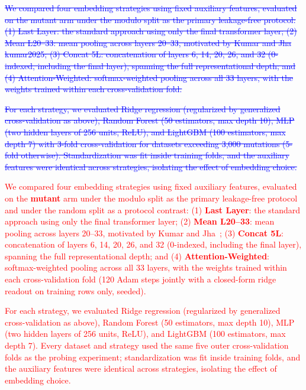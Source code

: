 \documentclass[11pt,a4paper]{article}
\newcommand{\rev}[1]{\textcolor{red}{#1}}
\begin{document}
\textcolor{blue}{\sout{We compared four embedding strategies using fixed auxiliary features,
evaluated on the mutant arm under the modulo split as the primary
leakage-free protocol: (1) Last Layer: the standard approach using only the
final transformer layer;
(2) Mean L20--33: mean pooling across layers 20--33, motivated by
Kumar and Jha kumar2025;
(3) Concat 5L: concatenation of layers 6, 14, 20, 26, and 32 (0-indexed,
including the final layer), spanning the full representational depth; and
(4) Attention-Weighted: softmax-weighted pooling across all 33 layers, with
the weights trained within each cross-validation fold.}}

\textcolor{blue}{\sout{For each strategy, we evaluated Ridge regression (regularized by generalized
cross-validation as above), Random Forest (50 estimators,
max depth 10), MLP (two hidden layers of 256 units, ReLU), and LightGBM (100 estimators,
max depth 7) with 3-fold cross-validation for datasets exceeding 3,000 mutations
(5-fold otherwise). Standardization was fit inside training folds, and the auxiliary
features were identical across strategies, isolating the effect of embedding choice.}}

\textcolor{red}{\rev{We compared four embedding strategies using fixed auxiliary features,
evaluated on the \textbf{mutant} arm under the modulo split as the primary
leakage-free protocol and under the random split as a protocol contrast: (1)
\textbf{Last Layer}: the standard approach using only the
final transformer layer;
(2) \textbf{Mean L20--33}: mean pooling across layers 20--33, motivated by
Kumar and Jha~\cite{kumar2025};
(3) \textbf{Concat 5L}: concatenation of layers 6, 14, 20, 26, and 32 (0-indexed,
including the final layer), spanning the full representational depth; and
(4) \textbf{Attention-Weighted}: softmax-weighted pooling across all 33 layers, with
the weights trained within each cross-validation fold (120 Adam steps jointly
with a closed-form ridge readout on training rows only, seeded).}}

\textcolor{red}{\rev{For each strategy, we evaluated Ridge regression (regularized by generalized
cross-validation as above), Random Forest (50 estimators,
max depth 10), MLP (two hidden layers of 256 units, ReLU), and LightGBM (100
estimators, max depth 7). Every dataset and strategy used the same five outer
cross-validation folds as the probing experiment; standardization was fit inside
training folds, and the auxiliary
features were identical across strategies, isolating the effect of embedding choice.}}
\end{document}
